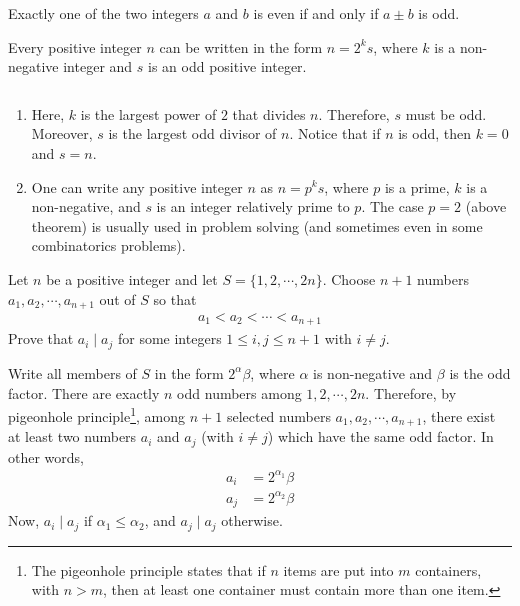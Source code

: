 \documentclass{subfile}
\begin{document}
	\begin{corollary}\label{cor:sumparity}
		Exactly one of the two integers $a$ and $b$ is even if and only if $a\pm b$ is odd.
	\end{corollary}

	\begin{theorem}\label{thm:factorizeintopowersoftwo}
		Every positive integer $n$ can be written in the form $n=2^ks$, where $k$ is a non-negative integer and $s$ is an odd positive integer.
	\end{theorem}

	\begin{note}
		$ $
		\begin{enumerate}
			\item Here, $k$ is the largest power of $2$ that divides $n$. Therefore, $s$ must be odd. Moreover, $s$ is the largest odd divisor of $n$. Notice that if $n$ is odd, then $k=0$ and $s=n$.
			\item  One can write any positive integer $n$ as $n=p^ks$, where $p$ is a prime, $k$ is a non-negative, and $s$ is an integer relatively prime to $p$. The case $p=2$ (above theorem) is usually used in problem solving (and sometimes even in some combinatorics problems).
		\end{enumerate}
	\end{note}

	\begin{problem}
		Let $n$ be a positive integer and let $S=\{1,2,\cdots,2n\}$. Choose $n+1$ numbers $a_1,a_2,\cdots, a_{n+1}$ out of $S$ so that
		\begin{align*}
			a_1<a_2<\cdots <a_{n+1}
		\end{align*}
		Prove that $a_i\mid a_j$ for some integers $1 \leq i,j \leq n+1$ with $i\neq j$.
	\end{problem}

	\begin{solution}
		Write all members of $S$ in the form $2^{\alpha}\beta$, where $\alpha$ is non-negative and $\beta$ is the odd factor. There are exactly $n$ odd numbers among $1,2,\cdots,2n$. Therefore, by pigeonhole principle\footnote{The pigeonhole principle states that if $n$ items are put into $m$ containers, with $n > m$, then at least one container must contain more than one item.}, among $n+1$ selected numbers $a_1,a_2,\cdots, a_{n+1}$, there exist at least two numbers $a_i$ and $a_j$ (with $i\neq j$) which have the same odd factor. In other words,
		\begin{align*}
			a_i
				& = 2^{\alpha_1}\beta\\
			a_j
				& = 2^{\alpha_2}\beta
		\end{align*}
		Now, $a_i\mid a_j$ if $\alpha_1\leq \alpha_2$, and $a_j\mid a_j$ otherwise.
	\end{solution}
\end{document}
